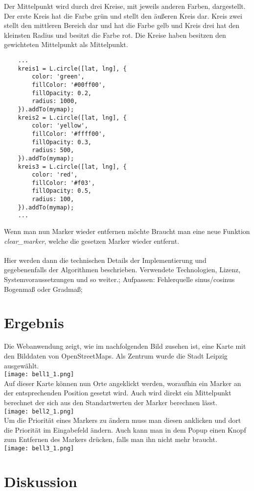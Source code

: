 \documentclass[a4paper, twoside, 12pt]{scrreprt}
\begin{document}
Der Mittelpunkt wird durch drei Kreise, mit jeweils anderen Farben, dargestellt.
Der erste Kreis hat die Farbe grün und stellt den äußeren Kreis dar.
Kreis zwei stellt den mittleren Bereich dar und hat die Farbe gelb und Kreis drei hat den kleinsten Radius und besitzt die Farbe rot.
Die Kreise haben besitzen den gewichteten Mittelpunkt als Mittelpunkt.
\begin{lstlisting}
	...
	kreis1 = L.circle([lat, lng], {
		color: 'green',
		fillColor: '#00ff00',
		fillOpacity: 0.2,
		radius: 1000,
	}).addTo(mymap);
	kreis2 = L.circle([lat, lng], {
		color: 'yellow',
		fillColor: '#ffff00',
		fillOpacity: 0.3,
		radius: 500,
	}).addTo(mymap);
	kreis3 = L.circle([lat, lng], {
		color: 'red',
		fillColor: '#f03',
		fillOpacity: 0.5,
		radius: 100,
	}).addTo(mymap);
	...
\end{lstlisting}
Wenn man nun Marker wieder entfernen möchte Braucht man eine neue Funktion \textit{clear\_marker}, welche die gesetzen Marker wieder entfernt.
\\\\Hier werden dann die technischen
 Details der Implementierung und gegebenenfalls der Algorithmen beschrieben.
Verwendete Technologien, Lizenz, Systemvoraussetzungen und so weiter.;
Aufpassen: Fehlerquelle sinus/cosinus Bogenmaß oder Gradmaß;
\chapter{Ergebnis}
Die Webanwendung zeigt, wie im nachfolgenden Bild zusehen ist, eine Karte mit den Bilddaten von OpenStreetMaps. Als Zentrum wurde die Stadt Leipzig ausgewählt.\\
\texttt{[image: bell1\_1.png]}\\
Auf dieser Karte können nun Orte angeklickt werden, woraufhin ein Marker an der entsprechenden Position gesetzt wird. Auch wird direkt ein Mittelpunkt berechnet der sich aus den Standartwerten der Marker berechnen lässt.\\
\texttt{[image: bell2\_1.png]}\\
Um die Priorität eines Markers zu ändern muss man diesen anklicken und dort die Priorität im Eingabefeld ändern. Auch kann man in dem Popup einen Knopf zum Entfernen des Markers drücken, falls man ihn nicht mehr braucht.\\
\texttt{[image: bell3\_1.png]}\\
\chapter{Diskussion}
\end{document}
